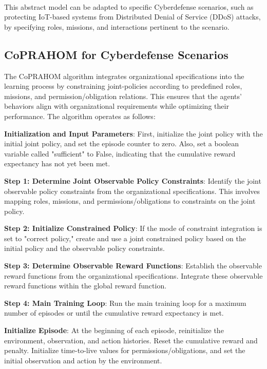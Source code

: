 \documentclass[conference]{IEEEtran}
\newcounter{relation}
\begin{document}
\

This abstract model can be adapted to specific Cyberdefense scenarios, such as protecting IoT-based systems from Distributed Denial of Service (DDoS) attacks, by specifying roles, missions, and interactions pertinent to the scenario.

\subsection{CoPRAHOM for Cyberdefense Scenarios}

The CoPRAHOM algorithm integrates organizational specifications into the learning process by constraining joint-policies according to predefined roles, missions, and permission/obligation relations. This ensures that the agents' behaviors align with organizational requirements while optimizing their performance. The algorithm operates as follows:

\textbf{Initialization and Input Parameters}: 
First, initialize the joint policy with the initial joint policy, and set the episode counter to zero. Also, set a boolean variable called "sufficient" to False, indicating that the cumulative reward expectancy has not yet been met.

\textbf{Step 1: Determine Joint Observable Policy Constraints}:
Identify the joint observable policy constraints from the organizational specifications. This involves mapping roles, missions, and permissions/obligations to constraints on the joint policy.

\textbf{Step 2: Initialize Constrained Policy}:
If the mode of constraint integration is set to "correct policy," create and use a joint constrained policy based on the initial policy and the observable policy constraints.

\textbf{Step 3: Determine Observable Reward Functions}:
Establish the observable reward functions from the organizational specifications. Integrate these observable reward functions within the global reward function.

\textbf{Step 4: Main Training Loop}:
Run the main training loop for a maximum number of episodes or until the cumulative reward expectancy is met.

\textbf{Initialize Episode}:
At the beginning of each episode, reinitialize the environment, observation, and action histories. Reset the cumulative reward and penalty. Initialize time-to-live values for permissions/obligations, and set the initial observation and action by the environment.
\end{document}
